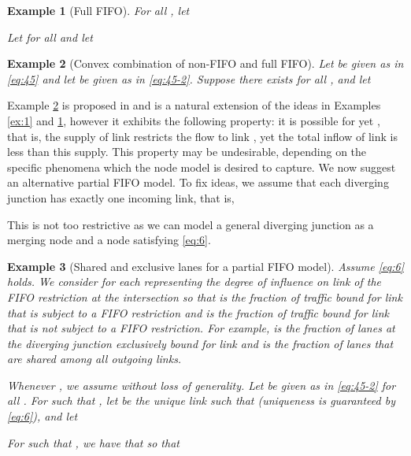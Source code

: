 \documentclass[letterpaper, 10 pt, conference]{ieeeconf}
\newtheorem{example}{Example}
\begin{document}
\begin{example}[Full FIFO]
\label{ex:2}
For all , let
  
Let  for all  and let

\end{example}

\begin{example}[Convex combination of non-FIFO and full FIFO]
\label{ex:3}
  Let  be given as in \eqref{eq:45} and let  be given as in \eqref{eq:45-2}. Suppose there exists  for all , and let
  
\end{example}

Example \ref{ex:3} is proposed in  \cite[Example 4]{Lovisari:2014qv} and is a natural extension of the ideas in Examples \ref{ex:1} and \ref{ex:2}, however it exhibits the following property: it is possible for  yet , that is, the supply of link  restricts the flow to link , yet the total inflow of link  is less than this supply. This property may be undesirable, depending on the specific phenomena which the node model is desired to capture. We now suggest an alternative partial FIFO model. To fix ideas, we assume that each diverging junction has exactly one incoming link, that is,

This is not too restrictive as we can model a general diverging junction as a merging node and a node satisfying \eqref{eq:6}.

\newcommand{\thetaF}{\theta^\textnormal{F}}
\begin{example}[Shared and exclusive lanes for a partial FIFO model]
\label{ex:4}
Assume \eqref{eq:6} holds. We consider  for each  representing the degree of influence on link  of the FIFO restriction at the intersection so that  is the fraction of traffic bound for link  that is subject to a FIFO restriction and  is the fraction of traffic bound for link  that is not subject to a FIFO restriction. For example,  is the fraction of lanes at the diverging junction exclusively bound for link  and  is the fraction of lanes that are shared among all outgoing links. 

Whenever , we assume  without loss of generality.
Let  be given as in \eqref{eq:45-2} for all .
For  such that , let  be the unique link such that  (uniqueness is guaranteed by \eqref{eq:6}), and let

For  such that , we have that  so that

\end{example}
\end{document}
